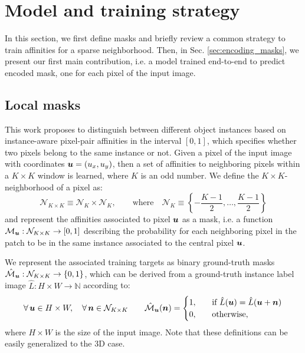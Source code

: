 
\section{Model and training strategy}\label{sec:model}
In this section, we first define \maskname masks and briefly review a common strategy to train affinities for a sparse neighborhood.
Then, in Sec. \ref{sec:encoding_masks}, we present our first main contribution, i.e. a model trained end-to-end to predict encoded \maskname mask, one for each pixel of the input image. 

\subsection{Local \maskname masks}\label{sec:self_masks}
This work proposes to distinguish between different object instances based on instance-aware pixel-pair affinities in the interval $[0,1]$, which specifies whether two pixels belong to the same instance or not.
Given a pixel of the input image with coordinates $\bm{u}= (u_x, u_y)$, then a set of affinities to neighboring pixels within a $K\times K$ window is learned, where $K$ is an odd number. 
We define the $K\times K$-neighborhood of a pixel as:
\begin{equation}
\mathcal{N}_{K\times K} \equiv \mathcal{N}_{K} \times \mathcal{N}_{K}, \qquad \text{where} \quad \mathcal{N}_{K} \equiv \left\{-\frac{K-1}{2}, \ldots, \frac{K-1}{2}\right\}
\end{equation}
and represent the affinities associated to pixel $\bm{u}$ as a \maskname mask, i.e. a function $\mathcal{M}_{\bm{u}}: \mathcal{N}_{K\times K} \rightarrow [0,1]$ describing the probability for each neighboring pixel in the patch to be in the same instance associated to the central pixel $\bm{u}$.

We represent the associated training targets as binary ground-truth masks $\hat{\mathcal{M}}_{\bm{u}}: \mathcal{N}_{K\times K} \rightarrow \{0,1\}$, which can be derived from a ground-truth instance label image $\hat{L}: H\times W \rightarrow \mathbb{N}$ according to:
\begin{equation}\label{eq:target_masks}
\forall\, \bm{u}\in H\times W, \quad \forall\, \bm{n}\in \mathcal{N}_{K\times K} \qquad \hat{\mathcal{M}}_{\bm{u}}(\bm{n}) = 
\begin{cases}
1, \quad &\text{if } \hat{L}(\bm{u}) = \hat{L}(\bm{u}+\bm{n}) \\
0, \quad & \text{otherwise},
\end{cases}
\end{equation}
where $H\times W$ is the size of the input image. Note that these definitions can be easily generalized to the 3D case.

